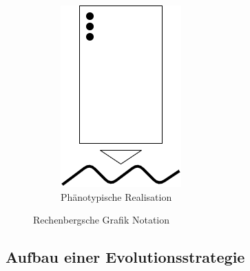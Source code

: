 \begin{figure}[!htb]
\begin{subfigure}{.3\textwidth}
	\centering
	\includegraphics[width=.5\linewidth]{img/rechenberg_notation/phaenotypische_realisation.png}
	\caption{Phänotypische Realisation}
	\label{fig:phaenotypische_realisation}
\end{subfigure}
\caption{Rechenbergsche Grafik Notation}
\label{fig:rechenberg}
\end{figure}


\subsection{Aufbau einer Evolutionsstrategie}

